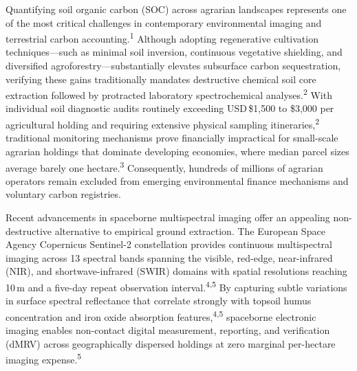 \documentclass[a4paper,10pt]{article}
\begin{document}
Quantifying soil organic carbon (SOC) across agrarian landscapes represents one of the most critical challenges in contemporary environmental imaging and terrestrial carbon accounting.\textsuperscript{1} Although adopting regenerative cultivation techniques---such as minimal soil inversion, continuous vegetative shielding, and diversified agroforestry---substantially elevates subsurface carbon sequestration, verifying these gains traditionally mandates destructive chemical soil core extraction followed by protracted laboratory spectrochemical analyses.\textsuperscript{2} With individual soil diagnostic audits routinely exceeding USD\,\$1,500 to \$3,000 per agricultural holding and requiring extensive physical sampling itineraries,\textsuperscript{2} traditional monitoring mechanisms prove financially impractical for small-scale agrarian holdings that dominate developing economies, where median parcel sizes average barely one hectare.\textsuperscript{3} Consequently, hundreds of millions of agrarian operators remain excluded from emerging environmental finance mechanisms and voluntary carbon registries.

Recent advancements in spaceborne multispectral imaging offer an appealing non-destructive alternative to empirical ground extraction. The European Space Agency Copernicus Sentinel-2 constellation provides continuous multispectral imaging across 13 spectral bands spanning the visible, red-edge, near-infrared (NIR), and shortwave-infrared (SWIR) domains with spatial resolutions reaching 10\,m and a five-day repeat observation interval.\textsuperscript{4,5} By capturing subtle variations in surface spectral reflectance that correlate strongly with topsoil humus concentration and iron oxide absorption features,\textsuperscript{4,5} spaceborne electronic imaging enables non-contact digital measurement, reporting, and verification (dMRV) across geographically dispersed holdings at zero marginal per-hectare imaging expense.\textsuperscript{5} 
\end{document}
